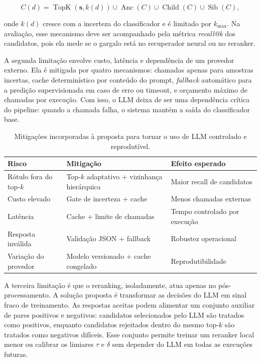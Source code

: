 \documentclass[11pt,a4paper]{article}
\begin{document}
\begin{equation}
  C(d)=\operatorname{TopK}(\mathbf{s}, k(d)) \cup
  \operatorname{Anc}(C) \cup \operatorname{Child}(C) \cup \operatorname{Sib}(C),
\end{equation}

\noindent onde $k(d)$ cresce com a incerteza do classificador e é limitado por
$k_{\max}$. Na avaliação, esse mecanismo deve ser acompanhado pela métrica
\textit{recall@k} dos candidatos, pois ela mede se o gargalo está no recuperador
neural ou no reranker.

A segunda limitação envolve custo, latência e dependência de um provedor externo.
Ela é mitigada por quatro mecanismos: chamadas apenas para amostras incertas,
cache determinístico por conteúdo do prompt, \textit{fallback} automático para a
predição supervisionada em caso de erro ou timeout, e orçamento máximo de
chamadas por execução. Com isso, o LLM deixa de ser uma dependência crítica do
pipeline: quando a chamada falha, o sistema mantém a saída do classificador base.

\begin{table}[htbp]
\centering
\begin{tabular}{lll}
\toprule
\textbf{Risco} & \textbf{Mitigação} & \textbf{Efeito esperado} \\
\midrule
Rótulo fora do top-$k$ & Top-$k$ adaptativo + vizinhança hierárquica & Maior recall de candidatos \\
Custo elevado & Gate de incerteza + cache & Menos chamadas externas \\
Latência & Cache + limite de chamadas & Tempo controlado por execução \\
Resposta inválida & Validação JSON + fallback & Robustez operacional \\
Variação do provedor & Modelo versionado + cache congelado & Reprodutibilidade \\
\bottomrule
\end{tabular}
\caption{Mitigações incorporadas à proposta para tornar o uso de LLM controlado
e reprodutível.}
\label{tab:mitigations}
\end{table}

A terceira limitação é que o reranking, isoladamente, atua apenas no
pós-processamento. A solução proposta é transformar as decisões do LLM em sinal
fraco de treinamento. As respostas aceitas podem alimentar um conjunto auxiliar
de pares positivos e negativos: candidatos selecionados pelo LLM são tratados
como positivos, enquanto candidatos rejeitados dentro do mesmo top-$k$ são
tratados como negativos difíceis. Esse conjunto permite treinar um reranker local
menor ou calibrar os limiares $\tau$ e $\delta$ sem depender do LLM em todas as
execuções futuras.
\end{document}
